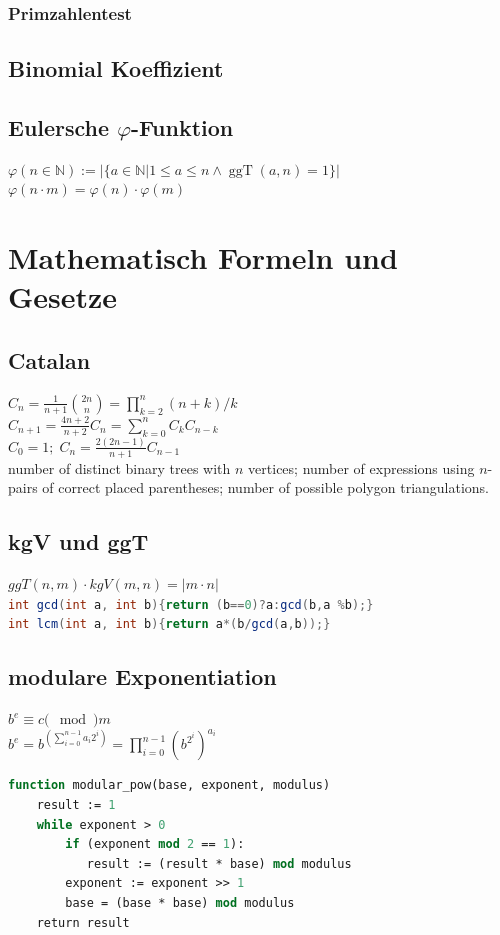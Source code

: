 \documentclass[10pt,a4paper,ngerman,oneside,]{article}
\newcommand{\N}{\ensuremath{\mathbb{N}}}
\newcommand{\ggT}{\ensuremath{\operatorname{ggT}}}
\begin{document}
\begin{multicols}{2}
\subsubsection{Primzahlentest}
\subsection{Binomial Koeffizient}
\subsection{Eulersche $\varphi$-Funktion}
$\varphi(n\in\N):=|\{a\in\N |1\leq a \leq n \wedge \ggT (a,n)=1\}|$\\
$\varphi(n\cdot m)=\varphi(n)\cdot\varphi(m)$

\section{Mathematisch Formeln und Gesetze}
\subsection{Catalan}
$C_n = \frac1{n+1}\binom{2n}{n}=\prod_{k=2}^n (n+k)/k$\\
$C_{n+1} = \frac{4n+2}{n+2}C_n=\sum_{k=0}^{n}C_kC_{n-k}$\\
$C_0 = 1;\;C_n = \frac{2(2n-1)}{n+1}C_{n-1}$\\

number of distinct binary trees with $n$ vertices; number of expressions using $n$-pairs of correct placed parentheses;
	number of possible polygon triangulations.

\subsection{kgV und ggT}
$ggT(n,m)\cdot kgV(m,n)=|m\cdot n|$\\
\lstinline[language=Java]|int gcd(int a, int b){return (b==0)?a:gcd(b,a %b);}|\\
\lstinline[language=Java]|int lcm(int a, int b){return a*(b/gcd(a,b));}|
\subsection{modulare Exponentiation}
$b^e \equiv c (\mod) m$\\
$b^e = b^{\left( \sum_{i=0}^{n-1} a_i 2^i \right)} = \prod_{i=0}^{n-1} \left( b^{2^i} \right) ^ {a_i}$
\begin{lstlisting}[language=pascal]
function modular_pow(base, exponent, modulus)
    result := 1
    while exponent > 0
        if (exponent mod 2 == 1):
           result := (result * base) mod modulus
        exponent := exponent >> 1
        base = (base * base) mod modulus
    return result
\end{lstlisting}



\end{multicols}
\end{document}
